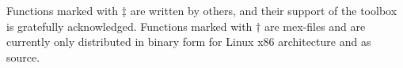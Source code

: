 \documentclass{article}
\newcommand{\mdes}[1]{\hskip -1.25in 
{\hbox{\makebox[1.25in][l]{\Refon Description}}}{#1}\vskip 0.25in}
\newcommand{\msa}[1]{\hskip -1.25in 
{\hbox{\makebox[1.25in][l]{\Refon See Also}}}{#1}\vskip 0.25in}
\newcommand{\mex}[1]{\hskip -1.25in 
{\hbox{\makebox[1.25in][l]{\Refon Examples}}}{#1}\vskip 0.25in}
\newcommand{\mlim}[1]{\hskip -1.25in 
{\hbox{\makebox[1.25in][l]{\Refon Limitations}}}{#1}\vskip 0.25in}
\newcommand{\mdia}[1]{\hskip -1.25in 
{\hbox{\makebox[1.25in][l]{\Refon Diagnostics}}}{#1}\vskip 0.25in}
\newcommand{\mpur}[1]{\hskip -1.25in 
{\hbox{\makebox[1.25in][l]{\Refon Purpose}}}{#1}\vskip 0.25in}
\newcommand{\malg}[1]{\hskip -1.25in 
{\hbox{\makebox[1.25in][l]{\Refon Algorithm}}}{#1}\vskip 0.25in}
\newcommand{\mcau}[1]{\hskip -1.25in 
{\hbox{\makebox[1.25in][l]{\Refon Cautionary}}}{#1}\vskip 0.25in}
\begin{document}
{{{%
Functions marked with $\ddagger$ are written by others, and their
support of the toolbox is gratefully acknowledged.
Functions marked with $\dagger$ are mex-files and are currently only distributed in
binary form for Linux x86 architecture and as source.
\vfil\eject


%
%
%
%
%
%
%
%
%
%
%
}}}
\end{document}
